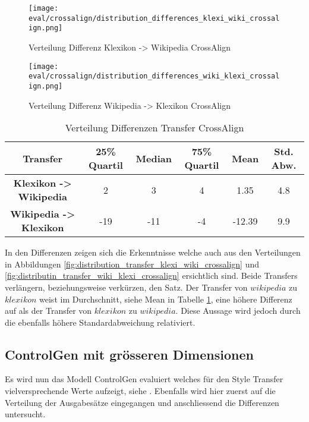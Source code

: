 \begin{figure}[H]
      \texttt{[image: eval/crossalign/distribution\_differences\_klexi\_wiki\_crossalign.png]}
      \caption{Verteilung Differenz Klexikon -> Wikipedia CrossAlign}\label{fig:distribution_diff_klexi_wiki_crossalign}
    \endminipage\hfill
      \texttt{[image: eval/crossalign/distribution\_differences\_wiki\_klexi\_crossalign.png]}
      \caption{Verteilung Differenz Wikipedia -> Klexikon CrossAlign}\label{fig:distribution_diff_wiki_klexi_crossalign}
    \endminipage\hfill      
 \end{figure}
 \begin{table}[H]
    \centering
    \begin{tabular}{|c|c|c|c|c|c|}
      \hline
      \textbf{Transfer}& \textbf{25\% Quartil}& \textbf{Median}& \textbf{75\% Quartil} & \textbf{Mean} &
      \textbf{Std. Abw.}\\
      \hline
      \textbf{Klexikon -> Wikipedia}& 2 & 3 & 4 & 1.35 & 4.8\\
      \hline
      \textbf{Wikipedia -> Klexikon}& -19 & -11 & -4 & -12.39 & 9.9\\
      \hline
    \end{tabular}
    \caption{Verteilung Differenzen Transfer CrossAlign}
    \label{tab:difference_transfer_crossalign}
  \end{table}  
\noindent
\newline
In den Differenzen zeigen sich die Erkenntnisse welche auch aus den Verteilungen in Abbildungen
\ref{fig:distribution_transfer_klexi_wiki_crossalign} und \ref{fig:distributin_transfer_wiki_klexi_crossalign}
ersichtlich sind. Beide Transfers verlängern, beziehungsweise verkürzen, den Satz. Der Transfer von $ wikipedia $ zu $
klexikon $ weist im Durchschnitt, siehe Mean in Tabelle \ref{tab:difference_transfer_crossalign}, eine höhere Differenz
auf als der Transfer von $ klexikon $ zu $ wikipedia $. Diese Aussage wird jedoch durch die ebenfalls höhere
Standardabweichung relativiert.

\subsection{ControlGen mit grösseren Dimensionen}
\label{sec:eval-higher-dimensions}

Es wird nun das Modell ControlGen evaluiert welches für den Style Transfer vielversprechende Werte aufzeigt, siehe
. Ebenfalls wird hier zuerst auf die Verteilung der Ausgabesätze
eingegangen und anschliessend die Differenzen untersucht.


